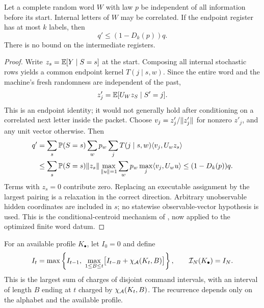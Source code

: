 \begin{lemma}\label{lem:packet}
Let a complete random word $W$ with law $p$ be independent of all information before its start. Internal letters of $W$ may be correlated. If the endpoint register has at most $k$ labels, then
\begin{equation}\label{eq:packet-contraction}
                       q'\le(1-D_k(p))q.
\end{equation}
There is no bound on the intermediate registers.
\end{lemma}
\begin{proof}
Write $z_s=\mathbb E[Y\mid S=s]$ at the start. Composing all internal stochastic rows yields a common endpoint kernel $T(j\mid s,w)$. Since the entire word and the machine's fresh randomness are independent of the past,
\[
 z'_j=\mathbb E[U_Wz_S\mid S'=j].
\]
This is an endpoint identity; it would not generally hold after conditioning on a correlated next letter inside the packet. Choose $v_j=z'_j/\lVert z'_j\rVert$ for nonzero $z'_j$, and any unit vector otherwise. Then
\begin{align*}
 q'&=\sum_s\mathbb P(S=s)\sum_w p_w\sum_jT(j\mid s,w)\langle v_j,U_wz_s\rangle\\
 &\le\sum_s\mathbb P(S=s)\lVert z_s\rVert
       \max_{\lVert u\rVert=1}\sum_w p_w\max_j\langle v_j,U_wu\rangle
 \le(1-D_k(p))q.
\end{align*}
Terms with $z_s=0$ contribute zero. Replacing an executable assignment by the largest pairing is a relaxation in the correct direction. Arbitrary unobservable hidden coordinates are included in $s$; no statewise observable-vector hypothesis is used. This is the conditional-centroid mechanism of \cite{GTF35,GTF42}, now applied to the optimized finite word datum.
\end{proof}

For an available profile $K_\bullet$, let $I_0=0$ and define
\begin{equation}\label{eq:interval-recursion}
 I_t=\max\left\{I_{t-1},\ 
        \max_{1\le B\le t}\bigl[I_{t-B}+\chi_{\calA}(K_t,B)\bigr]\right\},
 \qquad \mathcal I_N(K_\bullet)=I_N.
\end{equation}
This is the largest sum of charges of disjoint command intervals, with an interval of length $B$ ending at $t$ charged by $\chi_{\mathcal A}(K_t,B)$. The recurrence depends only on the alphabet and the available profile.

